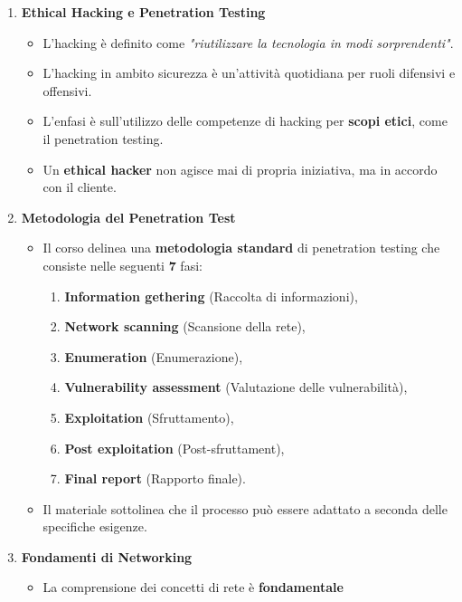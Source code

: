 \documentclass[12pt]{article}
\begin{document}
\begin{enumerate}
    \item \textbf{Ethical Hacking e Penetration Testing}
    \begin{itemize}
        \item L'hacking \`{e} definito come \textit{"riutilizzare la tecnologia in modi 
        sorprendenti"}.
        \item L'hacking in ambito sicurezza \`{e} un'attivit\`{a} quotidiana 
        per ruoli difensivi e offensivi.
        \item L'enfasi \`{e} sull'utilizzo delle competenze di hacking per 
        \textbf{scopi etici}, come il penetration testing.
        \item Un \textbf{ethical hacker} non agisce mai di propria iniziativa, 
        ma in accordo con il cliente.
    \end{itemize}
    \item \textbf{Metodologia del Penetration Test}
    \begin{itemize}
        \item Il corso delinea una \textbf{metodologia standard} di penetration 
        testing che consiste nelle seguenti \textbf{7} fasi:
        \begin{enumerate}
            \item \textbf{Information gethering} (Raccolta di informazioni),
            \item \textbf{Network scanning} (Scansione della rete),
            \item \textbf{Enumeration} (Enumerazione),
            \item \textbf{Vulnerability assessment} (Valutazione delle 
            vulnerabilit\`{a}),
            \item \textbf{Exploitation} (Sfruttamento),
            \item \textbf{Post exploitation} (Post-sfruttament),
            \item \textbf{Final report} (Rapporto finale).
        \end{enumerate}
        \item Il materiale sottolinea che il processo pu\`{o} essere adattato a 
        seconda delle specifiche esigenze.
    \end{itemize}
    \item \textbf{Fondamenti di Networking}
    \begin{itemize}
        \item La comprensione dei concetti di rete \`{e} \textbf{fondamentale} 

\end{itemize}
\end{enumerate}
\end{document}

